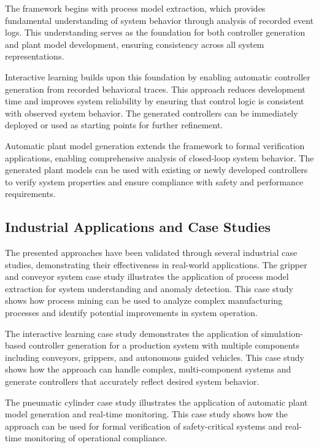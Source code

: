 The framework begins with process model extraction, which provides fundamental understanding of system behavior through analysis of recorded event logs. This understanding serves as the foundation for both controller generation and plant model development, ensuring consistency across all system representations.

Interactive learning builds upon this foundation by enabling automatic controller generation from recorded behavioral traces. This approach reduces development time and improves system reliability by ensuring that control logic is consistent with observed system behavior. The generated controllers can be immediately deployed or used as starting points for further refinement.

Automatic plant model generation extends the framework to formal verification applications, enabling comprehensive analysis of closed-loop system behavior. The generated plant models can be used with existing or newly developed controllers to verify system properties and ensure compliance with safety and performance requirements.

\subsection{Industrial Applications and Case Studies}

The presented approaches have been validated through several industrial case studies, demonstrating their effectiveness in real-world applications. The gripper and conveyor system case study illustrates the application of process model extraction for system understanding and anomaly detection. This case study shows how process mining can be used to analyze complex manufacturing processes and identify potential improvements in system operation.

The interactive learning case study demonstrates the application of simulation-based controller generation for a production system with multiple components including conveyors, grippers, and autonomous guided vehicles. This case study shows how the approach can handle complex, multi-component systems and generate controllers that accurately reflect desired system behavior.

The pneumatic cylinder case study illustrates the application of automatic plant model generation and real-time monitoring. This case study shows how the approach can be used for formal verification of safety-critical systems and real-time monitoring of operational compliance.

